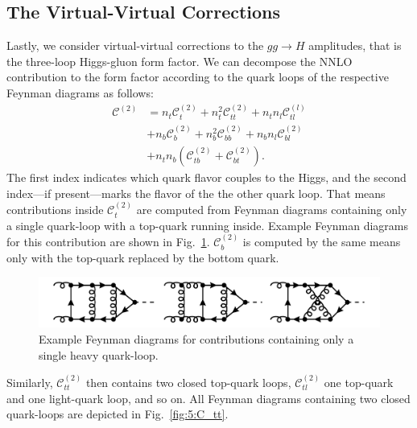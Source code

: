 \subsection{The Virtual-Virtual Corrections} \label{subsec:5:virtual_virtual_corrections}
Lastly, we consider virtual-virtual corrections to the $gg \longrightarrow H$ amplitudes, that is the three-loop Higgs-gluon form factor. We can decompose the \acs{NNLO} contribution to the form factor according to the quark loops of the respective Feynman diagrams as follows:
\begin{equation}
\begin{split}
\mathcal{C}^{(2)} &=  n_t \mathcal{C}_t^{(2)} + n_t^2 \mathcal{C}_{tt}^{(2)} + n_t n_l \mathcal{C}_{tl}^{(l)} \\
& + n_b \mathcal{C}_b^{(2)} + n_b^2 \mathcal{C}_{bb}^{(2)} + n_b n_l \mathcal{C}_{bl}^{(2)} \\
& + n_t n_b \left( \mathcal{C}_{tb}^{(2)} + \mathcal{C}_{bt}^{(2)} \right).
\end{split}
\end{equation}
The first index indicates which quark flavor couples to the Higgs, and the second index---if present---marks the flavor of the the other quark loop.
That means contributions inside $\mathcal{C}_t^{(2)}$ are computed from Feynman diagrams containing only a single quark-loop with a top-quark running inside. Example Feynman diagrams for this contribution are shown in Fig.~\ref{fig:5:C_t}. $\mathcal{C}_{b}^{(2)}$ is computed by the same means only with the top-quark replaced by the bottom quark.
\begin{figure}[h]
\centering
\includegraphics[width=\figurewidth]{Images/NNLO_Feynman_diagrams/C_t.pdf}
\caption{Example Feynman diagrams for contributions containing only a single heavy quark-loop.}
\label{fig:5:C_t}
\end{figure}
Similarly, $\mathcal{C}_{tt}^{(2)}$ then contains two closed top-quark loops, $\mathcal{C}_{tl}^{(2)}$ one top-quark and one light-quark loop, and so on. All Feynman diagrams containing two closed quark-loops are depicted in Fig.~\ref{fig:5:C_tt}.
%
